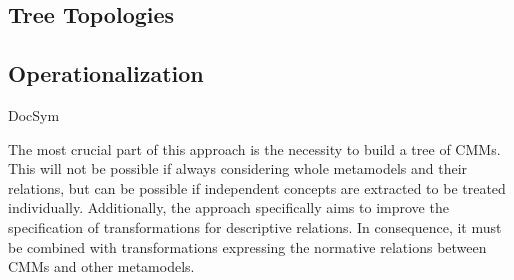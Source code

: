 \subsection{Tree Topologies}

\subsection{Operationalization}



\begin{copiedFrom}{DocSym} %

The most crucial part of this approach is the necessity to build a tree of \glspl{CMM}.
This will not be possible if always considering whole metamodels and their relations, but can be possible if independent concepts are extracted to be treated individually.
Additionally, the approach specifically aims to improve the specification of transformations for descriptive relations.
In consequence, it must be combined with transformations expressing the normative relations between \glspl{CMM} and other metamodels.

\end{copiedFrom} %


